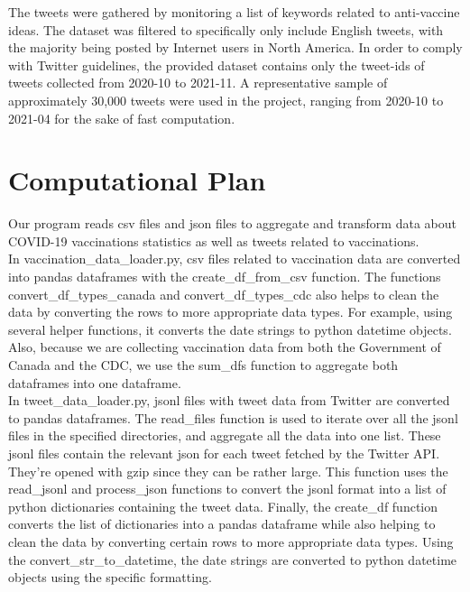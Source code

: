 \documentclass[fontsize=11pt]{article}
\begin{document}
The tweets were gathered by monitoring a list of keywords related to anti-vaccine ideas. The dataset was filtered to specifically only include English tweets, with the majority being posted by Internet users in North America. In order to comply with Twitter guidelines, the provided dataset contains only the tweet-ids of tweets collected from 2020-10 to 2021-11. A representative sample of approximately 30,000 tweets were used in the project, ranging from 2020-10 to 2021-04 for the sake of fast computation.\\




\section*{Computational Plan}

Our program reads csv files and json files to aggregate and transform data about COVID-19 vaccinations statistics as well as tweets related to vaccinations.\\

In vaccination\_data\_loader.py, csv files related to vaccination data are converted into pandas dataframes with the create\_df\_from\_csv function. The functions convert\_df\_types\_canada and convert\_df\_types\_cdc also helps to clean the data by converting the rows to more appropriate data types. For example, using several helper functions, it converts the date strings to python datetime objects. Also, because we are collecting vaccination data from both the Government of Canada and the CDC, we use the sum\_dfs function to aggregate both dataframes into one dataframe.\\

In tweet\_data\_loader.py, jsonl files with tweet data from Twitter are converted to pandas dataframes. The read\_files function is used to iterate over all the jsonl files in the specified directories, and aggregate all the data into one list. These jsonl files contain the relevant json for each tweet fetched by the Twitter API. They’re opened with gzip since they can be rather large. This function uses the read\_jsonl and process\_json functions to convert the jsonl format into a list of python dictionaries containing the tweet data. Finally, the create\_df function converts the list of dictionaries into a pandas dataframe while also helping to clean the data by converting certain rows to more appropriate data types. Using the convert\_str\_to\_datetime, the date strings are converted to python datetime objects using the specific formatting. \\
\end{document}
